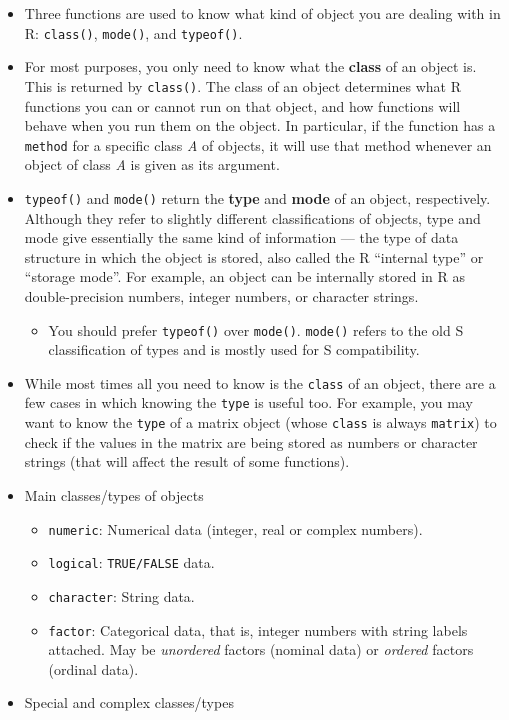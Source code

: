 \documentclass[
]{book}
\providecommand{\tightlist}{%
  \setlength{\itemsep}{0pt}\setlength{\parskip}{0pt}}
\begin{document}
\begin{itemize}
\item
  Three functions are used to know what kind of object you are dealing with in R: \texttt{class()}, \texttt{mode()}, and \texttt{typeof()}.
\item
  For most purposes, you only need to know what the \textbf{class} of an object is. This is returned by \texttt{class()}. The class of an object determines what R functions you can or cannot run on that object, and how functions will behave when you run them on the object. In particular, if the function has a \texttt{method} for a specific class \emph{A} of objects, it will use that method whenever an object of class \emph{A} is given as its argument.
\item
  \texttt{typeof()} and \texttt{mode()} return the \textbf{type} and \textbf{mode} of an object, respectively. Although they refer to slightly different classifications of objects, type and mode give essentially the same kind of information --- the type of data structure in which the object is stored, also called the R ``internal type'' or ``storage mode''. For example, an object can be internally stored in R as double-precision numbers, integer numbers, or character strings.

  \begin{itemize}
  \tightlist
  \item
    You should prefer \texttt{typeof()} over \texttt{mode()}. \texttt{mode()} refers to the old S classification of types and is mostly used for S compatibility.
  \end{itemize}
\item
  While most times all you need to know is the \texttt{class} of an object, there are a few cases in which knowing the \texttt{type} is useful too. For example, you may want to know the \texttt{type} of a matrix object (whose \texttt{class} is always \texttt{matrix}) to check if the values in the matrix are being stored as numbers or character strings (that will affect the result of some functions).
\item
  Main classes/types of objects

  \begin{itemize}
  \tightlist
  \item
    \texttt{numeric}: Numerical data (integer, real or complex numbers).
  \item
    \texttt{logical}: \texttt{TRUE/FALSE} data.
  \item
    \texttt{character}: String data.
  \item
    \texttt{factor}: Categorical data, that is, integer numbers with string labels attached. May be \emph{unordered} factors (nominal data) or \emph{ordered} factors (ordinal data).
  \end{itemize}
\item
  Special and complex classes/types


\end{itemize}
\end{document}
